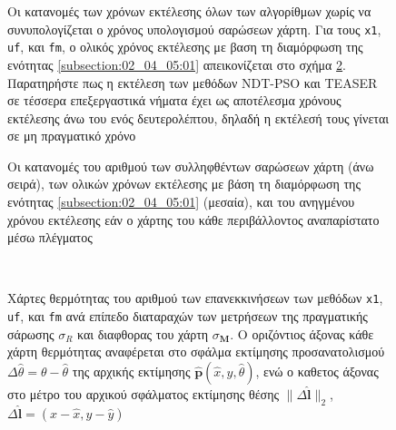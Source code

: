 \begin{figure}[!h]
  
  \vspace{1cm}
  \caption{\small Οι κατανομές των χρόνων εκτέλεσης όλων των αλγορίθμων χωρίς να
           συνυπολογίζεται ο χρόνος υπολογισμού σαρώσεων χάρτη. Για τους
           \texttt{x1}, \texttt{uf}, και \texttt{fm}, ο ολικός χρόνος εκτέλεσης
           με βαση τη διαμόρφωση της ενότητας \ref{subsection:02_04_05:01}
           απεικονίζεται στο σχήμα \ref{fig:02_04_05:03}. Παρατηρήστε πως η
           εκτέλεση των μεθόδων NDT-PSO και TEASER σε τέσσερα επεξεργαστικά
           νήματα έχει ως αποτέλεσμα χρόνους εκτέλεσης άνω του ενός
           δευτερολέπτου, δηλαδή η εκτέλεσή τους γίνεται σε μη πραγματικό
           χρόνο}
  \label{fig:02_04_05:02}
\end{figure}

\begin{figure}[!h]
  
  \vspace{1cm}
  \caption{\small Οι κατανομές του αριθμού των συλληφθέντων σαρώσεων χάρτη (άνω
           σειρά), των ολικών χρόνων εκτέλεσης με βάση τη διαμόρφωση της
           ενότητας \ref{subsection:02_04_05:01} (μεσαία), και του ανηγμένου
           χρόνου εκτέλεσης εάν ο χάρτης του κάθε περιβάλλοντος αναπαρίστατο
           μέσω πλέγματος}
  \label{fig:02_04_05:03}
\end{figure}

\begin{figure}[!h]\centering\vspace{1.5cm}
  \begin{subfigure}{\linewidth}
    
  \end{subfigure}\\\vspace{2.2cm}%
  \begin{subfigure}{\linewidth}\hspace{1.0cm}
    
  \end{subfigure}%
  \vspace{-1cm}
\caption{\small Χάρτες θερμότητας του αριθμού των επανεκκινήσεων των
         μεθόδων \texttt{x1}, \texttt{uf}, και \texttt{fm} ανά επίπεδο
         διαταραχών των μετρήσεων της πραγματικής σάρωσης $\sigma_R$ και
         διαφθορας του χάρτη $\sigma_{\bm{M}}$. Ο οριζόντιος άξονας κάθε χάρτη
         θερμότητας αναφέρεται στο σφάλμα εκτίμησης προσανατολισμού
         $\Delta\hat{\theta} = \theta-\hat{\theta}$ της αρχικής εκτίμησης
         $\hat{\bm{p}}(\hat{x},\hat{y},\hat{\theta})$, ενώ ο καθετος άξονας
         στο μέτρο του αρχικού σφάλματος εκτίμησης θέσης
         $\|\Delta \hat{\bm{l}}\|_2$, $\Delta\hat{\bm{l}} = (x-\hat{x}, y-\hat{y})$}
\label{fig:02_04_05:04}
\end{figure}


